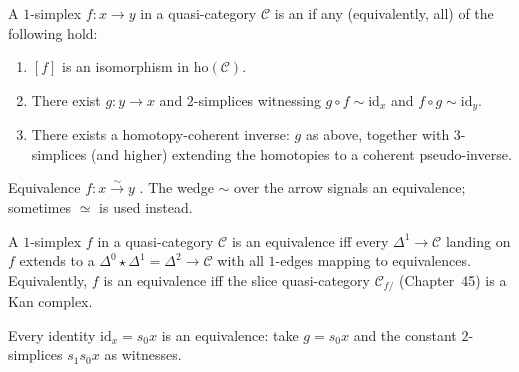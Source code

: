 \begin{definition}
\label{def:equivalence-1simplex}
A $1$-simplex $f : x \to y$ in a quasi-category $\mathcal{C}$ is an
 if any (equivalently, all) of the following hold:
\begin{enumerate}
  \item $[f]$ is an isomorphism in $\mathrm{ho}(\mathcal{C})$.
  \item There exist $g : y \to x$ and $2$-simplices witnessing
        $g \circ f \sim \mathrm{id}_x$ and $f \circ g \sim \mathrm{id}_y$.
  \item There exists a homotopy-coherent inverse: $g$ as above, together
        with $3$-simplices (and higher) extending the homotopies to a
        coherent pseudo-inverse.
\end{enumerate}
\end{definition}

\begin{howtosay}
Equivalence $f : x \xrightarrow{\sim} y$ . The wedge $\sim$ over
the arrow signals an equivalence; sometimes $\simeq$ is used instead.
\end{howtosay}

\begin{theorem}
\label{thm:equiv-delta3}
A $1$-simplex $f$ in a quasi-category $\mathcal{C}$ is an equivalence
iff every $\Delta^1 \to \mathcal{C}$ landing on $f$ extends to a
$\Delta^0 \star \Delta^1 = \Delta^2 \to \mathcal{C}$ with all $1$-edges
mapping to equivalences. Equivalently, $f$ is an equivalence iff the
slice quasi-category $\mathcal{C}_{f/}$ (Chapter~45) is a Kan complex.
\end{theorem}

\begin{example_thm}
\label{ex:id-equiv}
Every identity $\mathrm{id}_x = s_0 x$ is an equivalence: take $g =
s_0 x$ and the constant $2$-simplices $s_1 s_0 x$ as witnesses.
\end{example_thm}

